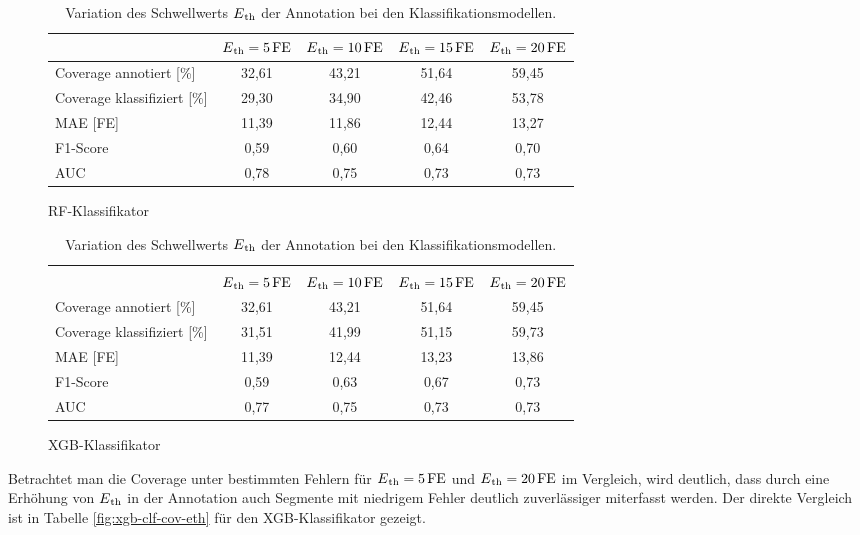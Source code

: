 \begin{table}[H]
	\begin{subfigure}{\textwidth}
	\centering
	\begin{tabular}{l || c | c | c | c}
								& $E\textsubscript{th}=5\,\si{FE}$	& $E\textsubscript{th}=10\,\si{FE}$	& $E\textsubscript{th}=15\,\si{FE}$	& $E\textsubscript{th}=20\,\si{FE}$	\\ \hline
	Coverage annotiert [\%]		& 32,61						& 43{,}21 					& 51,64						& 59,45\\
 	Coverage klassifiziert [\%]	& 29,30						& 34,90 					& 42,46						& 53,78\\
 	\ac{MAE} [FE]				& 11,39						& 11,86						& 12,44						& 13,27\\
 	F1-Score 					& 0,59						& 0,60						& 0,64						& 0,70\\
 	AUC 						& 0,78						& 0,75						& 0,73						& 0,73\\
 	\end{tabular}	
	\caption{\ac{RF}-Klassifikator}
	\end{subfigure}
	\begin{subfigure}{\textwidth}
	\centering
	\begin{tabular}{l || c | c | c | c}
	\multicolumn{5}{l}{	}	\\
								& $E\textsubscript{th}=5\,\si{FE}$	& $E\textsubscript{th}=10\,\si{FE}$	& $E\textsubscript{th}=15\,\si{FE}$	& $E\textsubscript{th}=20\,\si{FE}$	\\ \hline
	Coverage annotiert [\%]		& 32,61						& 43{,}21 					& 51,64						& 59,45\\
 	Coverage klassifiziert [\%]	& 31,51						& 41,99 					& 51,15						& 59,73\\
 	\ac{MAE} [FE]				& 11,39						& 12,44						& 13,23						& 13,86\\
 	F1-Score 					& 0,59						& 0,63						& 0,67						& 0,73\\
 	AUC 						& 0,77						& 0,75						& 0,73						& 0,73\\
 	\end{tabular}	
	\caption{\ac{XGB}-Klassifikator}
	\end{subfigure}
	\caption{Variation des Schwellwerts $E\textsubscript{th}$ der Annotation bei den Klassifikationsmodellen.}
	\label{fig:var-eth-clf}
\end{table}

Betrachtet man die Coverage unter bestimmten Fehlern für $E\textsubscript{th}= 5\text{\,}\si{FE}$ und $E\textsubscript{th}= 20\text{\,}\si{FE}$ im Vergleich, wird deutlich, dass durch eine Erhöhung von $E\textsubscript{th}$ in der Annotation auch Segmente mit niedrigem Fehler deutlich zuverlässiger miterfasst werden. Der direkte Vergleich ist in Tabelle \ref{fig:xgb-clf-cov-eth} für den \ac{XGB}-Klassifikator gezeigt.

